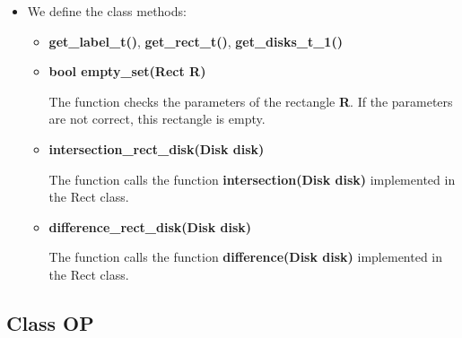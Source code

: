 \documentclass{report}
\begin{document}
\begin{itemize}
		\item We define the class methods:
		
		\begin{itemize}
			\item {\bfseries get\_label\_t()}, {\bfseries get\_rect\_t()}, {\bfseries get\_disks\_t\_1()}
			
			\item {\bfseries bool empty\_set(Rect R)}
			
			The function checks the parameters of the rectangle {\bfseries R}. If the parameters are not correct, this rectangle is empty. 
			
			\item {\bfseries intersection\_rect\_disk(Disk disk)} 
			
			The function calls the function {\bfseries intersection(Disk disk)}  implemented in the Rect class.
			
			\item {\bfseries difference\_rect\_disk(Disk disk)} 
			
			The function calls the function {\bfseries difference(Disk disk)}  implemented in the Rect class.
				
		\end{itemize}
	\end{itemize}

	\newpage	
	\subsection*{Class OP}
	\label{OP}
	
\end{document}
